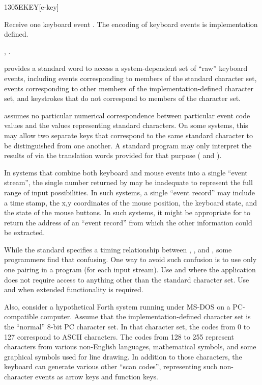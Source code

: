 \begin{worddef}{1305}{EKEY}[e-key]
\item {}

	Receive one keyboard event . The encoding of keyboard events
	is implementation defined.

\see {},
	.

	\begin{rationale} %
		 provides a standard word to access a
		system-dependent set of ``raw'' keyboard events, including
		events corresponding to members of the standard character
		set, events corresponding to other members of the
		implementation-defined character set, and keystrokes that
		do not correspond to members of the character set.

		 assumes no particular numerical correspondence
		between particular event code values and the values
		representing standard characters. On some systems, this may
		allow two separate keys that correspond to the same standard
		character to be distinguished from one another.
		A standard program may only interpret the results of
		 via the translation words provided for that
		purpose ( and ).

		In systems that combine both keyboard and mouse events into
		a single ``event stream'', the single number returned by
		 may be inadequate to represent the full range of
		input possibilities. In such systems, a single ``event
		record'' may include a time stamp, the x,y coordinates of
		the mouse position, the keyboard state, and the state of
		the mouse buttons. In such systems, it might be appropriate
		for  to return the address of an ``event record''
		from which the other information could be extracted.

		While the standard specifies a timing relationship between
		, ,  and , some
		programmers find that confusing.
		One way to avoid such confusion is to use only one pairing
		in a program (for each input stream).  Use  and
		 where the application does not require access to
		anything other than the standard character set.  Use
		 and  when extended functionality is
		required.

		Also, consider a hypothetical Forth system running under
		MS-DOS on a PC-compatible computer. Assume that the
		implementation-defined character set is the ``normal'' 8-bit
		PC character set. In that character set, the codes from 0 to
		127 correspond to ASCII characters. The codes from 128 to 255
		represent characters from various non-English languages,
		mathematical symbols, and some graphical symbols used for line
		drawing. In addition to those characters, the keyboard can
		generate various other ``scan codes'', representing such
		non-character events as arrow keys and function keys.


\end{rationale}
\end{worddef}
